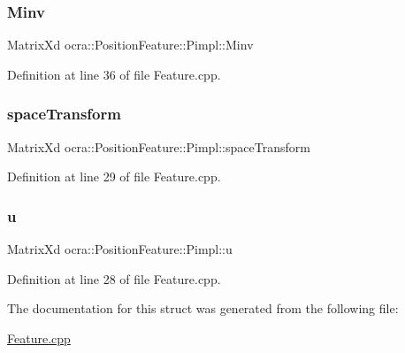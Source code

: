 \subsubsection{\texorpdfstring{Minv}{Minv}}
{\footnotesize\ttfamily Matrix\+Xd ocra\+::\+Position\+Feature\+::\+Pimpl\+::\+Minv}



Definition at line 36 of file Feature.\+cpp.

\hypertarget{structocra_1_1PositionFeature_1_1Pimpl_a2e80e58cc94be8c44f8fee3dd030192e}{}\label{structocra_1_1PositionFeature_1_1Pimpl_a2e80e58cc94be8c44f8fee3dd030192e} 
\subsubsection{\texorpdfstring{space\+Transform}{spaceTransform}}
{\footnotesize\ttfamily Matrix\+Xd ocra\+::\+Position\+Feature\+::\+Pimpl\+::space\+Transform}



Definition at line 29 of file Feature.\+cpp.

\hypertarget{structocra_1_1PositionFeature_1_1Pimpl_a5299db1f5f86c7a5808fbf1738ee438a}{}\label{structocra_1_1PositionFeature_1_1Pimpl_a5299db1f5f86c7a5808fbf1738ee438a} 
\subsubsection{\texorpdfstring{u}{u}}
{\footnotesize\ttfamily Matrix\+Xd ocra\+::\+Position\+Feature\+::\+Pimpl\+::u}



Definition at line 28 of file Feature.\+cpp.



The documentation for this struct was generated from the following file\+:\begin{DoxyCompactItemize}
\item 
\hyperlink{Feature_8cpp}{Feature.\+cpp}\end{DoxyCompactItemize}

